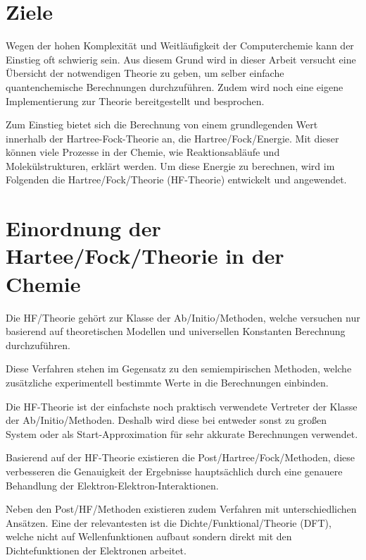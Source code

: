 \section{Ziele}
Wegen der hohen Komplexität und Weitläufigkeit der Computerchemie
kann der Einstieg oft schwierig sein. Aus diesem Grund wird
in dieser Arbeit versucht eine Übersicht der notwendigen Theorie zu geben,
um selber einfache quantenchemische Berechnungen durchzuführen.
Zudem wird noch eine eigene Implementierung
zur Theorie bereitgestellt und besprochen.

Zum Einstieg bietet sich die Berechnung von einem grundlegenden Wert
innerhalb der Hartree-Fock-Theorie an, die Hartree\-/Fock\-/Energie.
Mit dieser können viele Prozesse in der Chemie,
wie Reaktionsabläufe und Molekülstrukturen, erklärt werden.
Um diese Energie zu berechnen, wird im Folgenden
die Hartree\-/Fock\-/Theorie (HF-Theorie) entwickelt und angewendet.


\section{Einordnung der Hartee\-/Fock\-/Theorie in der Chemie} \label{posthf}
Die HF\-/Theorie gehört zur Klasse der Ab\-/Initio\-/Methoden,
welche versuchen nur basierend auf theoretischen Modellen und
universellen Konstanten Berechnung durchzuführen.
\cite[5.1, 5.2.2]{lewars_2016}

Diese Verfahren stehen im Gegensatz zu den semiempirischen Methoden,
welche zusätzliche experimentell bestimmte Werte in die Berechnungen einbinden.
\cite[S. 421]{lewars_2016}

Die HF-Theorie ist der einfachste noch praktisch verwendete Vertreter
der Klasse der Ab\-/Initio\-/Methoden.
Deshalb wird diese bei entweder sonst zu großen System oder
als Start-Approximation für sehr akkurate Berechnungen verwendet.
\cite[S. 433]{structure_2013}

Basierend auf der HF-Theorie existieren die Post\-/Hartree\-/Fock\-/Methoden,
diese verbesseren die Genauigkeit der Ergebnisse hauptsächlich
durch eine genauere Behandlung der Elektron-Elektron-Interaktionen.
\cite[5.4]{lewars_2016}

Neben den Post\-/HF\-/Methoden existieren zudem Verfahren
mit unterschiedlichen Ansätzen. Eine der relevantesten ist
die Dichte\-/Funktional\-/Theorie (DFT), welche nicht auf
Wellenfunktionen aufbaut sondern direkt mit den
Dichtefunktionen der Elektronen arbeitet.
\cite[7.1]{lewars_2016}